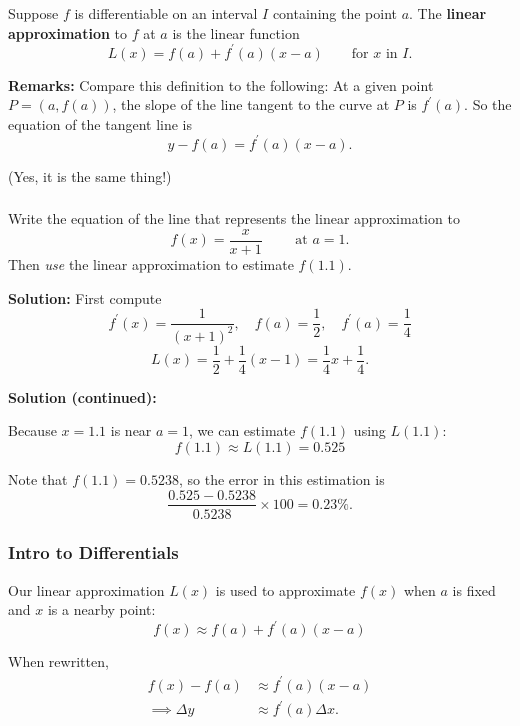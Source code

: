 \documentclass[14pt]{beamer}
\begin{document}
\begin{frame}
\frametitle{}
\footnotesize
\begin{dfn} Suppose $f$ is differentiable on an interval $I$ containing the point $a$.  The {\bf linear approximation} to $f$ at $a$ is the linear function
\[L(x)=f(a)+f^{\prime}(a)(x-a)\qquad\text{for $x$ in $I$.}\]
\end{dfn}

\vspace{1pc}
{\bf Remarks:} Compare this definition to the following: At a given point $P=(a,f(a))$, the slope of the line tangent to the curve at $P$ is $f^{\prime}(a)$.  So the equation of the tangent line is
\[y-f(a)=f^{\prime}(a)(x-a).\]

(Yes, it is the same thing!)
\end{frame}

\begin{frame}
\frametitle{}
\small
\begin{exe} Write the equation of the line that represents the linear approximation to 
\[f(x)=\dfrac{x}{x+1}\qquad\text{ at $a=1$.}\]  
Then {\it use} the linear approximation to estimate $f(1.1)$. \end{exe}

\vspace{1pc}
{\bf Solution:} First compute
\[f^{\prime}(x)=\dfrac{1}{(x+1)^2},\quad f(a)=\dfrac{1}{2},\quad f^{\prime}(a)=\dfrac{1}{4}\]
\[L(x)=\dfrac{1}{2}+\dfrac{1}{4}(x-1)=\dfrac{1}{4}x+\dfrac{1}{4}.\]
\end{frame}

\begin{frame}
\small
{\bf Solution (continued):}

\bigskip

Because $x=1.1$ is near $a=1$, we can estimate $f(1.1)$ using $L(1.1)$:
$$f(1.1) \approx L(1.1)= 0.525$$

\bigskip

Note that $f(1.1)=0.5238$, so the error in this estimation is
$$\dfrac{0.525-0.5238}{0.5238} \times 100=0.23 \%.$$
\end{frame}

\begin{frame}
\frametitle{\small Intro to Differentials}
\small
Our linear approximation $L(x)$ is used to approximate $f(x)$ when $a$ is fixed and $x$ is a nearby point:
\[f(x) \approx f(a)+f^{\prime}(a)(x-a)\]

\vspace{1pc}
When rewritten,
\begin{align*}
f(x)-f(a) & \approx f^{\prime}(a)(x-a) \\[0.5pc]
\implies \Delta y & \approx f^{\prime}(a) \Delta x.
\end{align*}
\end{frame}
\end{document}
